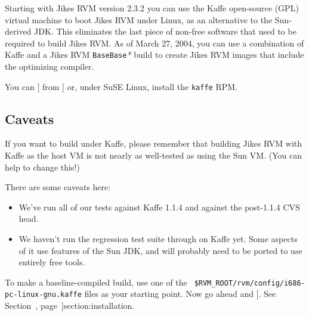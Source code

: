 \newcommand{\rvmbuild}[1]{\$RVM\_BUILD\texttt{/#1}}%
\newcommand{\gft}{\texttt{GenerateFromTemplate}}%
\newcommand{\gid}{\texttt{GenerateInterfaceDeclarations}}%
\newcommand{\biw}{\texttt{BootImageWriter}}%
%
%
Starting with Jikes RVM version 2.3.2 you can use the Kaffe open-source (GPL)
virtual machine to boot Jikes RVM under Linux, as an alternative to
the Sun-derived JDK.  This eliminates the last piece of non-free
software that used to be required to build Jikes RVM.  As of
March 27, 2004, you can use a combination of Kaffe and a Jikes RVM
\texttt{BaseBase}\textit{*} build to create Jikes RVM images that
include the optimizing compiler.

You can [ from {\tt \KaffeURL}]{\KaffeURL} or,
under SuSE Linux, install the {\tt kaffe} RPM.  

\subsection{Caveats}

If you want to build under Kaffe, please remember that building Jikes
RVM with Kaffe as the host VM is not nearly as well-tested as using
the Sun VM.  (You can help to change this!)

There are some caveats here:

\begin{itemize}

\item We've run all of our tests against Kaffe 1.1.4 and against the
post-1.1.4 CVS head.



\item We haven't run the regression test suite through on Kaffe yet.
  Some aspects of it use features of the Sun JDK, and will probably
  need to be ported to use entirely free tools.

\end{itemize}

To make a baseline-compiled build, use one of the {\tt
\$RVM\_\-ROOT/rvm/config/i686-pc-linux-gnu.kaffe{\it *}} files as your
starting point.  Now go ahead and [.  See Section~\Ref,
page~\Pageref]{section:installation}.

